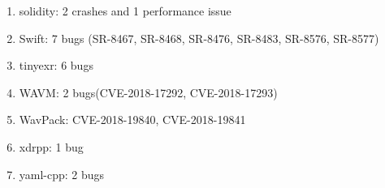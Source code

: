 \documentclass[paper=a4,fontsize=11pt]{article} %
\begin{document}
\begin{enumerate}
    \item solidity: 2 crashes and 1 performance issue
    \item Swift: 7 bugs (SR-8467, SR-8468, SR-8476, SR-8483, SR-8576, SR-8577)
    \item tinyexr: 6 bugs
    \item WAVM: 2 bugs(CVE-2018-17292, CVE-2018-17293)
    \item WavPack: CVE-2018-19840, CVE-2018-19841
    \item xdrpp: 1 bug
    \item yaml-cpp: 2 bugs
\end{enumerate}


 

\end{document}
